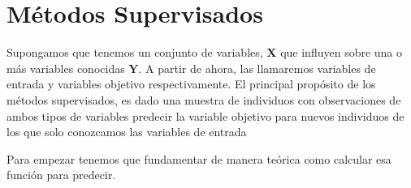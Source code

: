 \chapter{Métodos Supervisados}
Supongamos que tenemos un conjunto de variables, $\textbf{X}$ que influyen sobre una o más variables conocidas $\textbf{Y}$. A partir de ahora, las llamaremos variables de entrada y variables objetivo respectivamente. El principal propósito de los métodos supervisados, es dado una muestra de individuos con observaciones de ambos tipos de variables predecir la variable objetivo para nuevos individuos de los que solo conozcamos las variables de entrada  

Para empezar tenemos que fundamentar de manera teórica como calcular esa función para predecir. 



%

%

